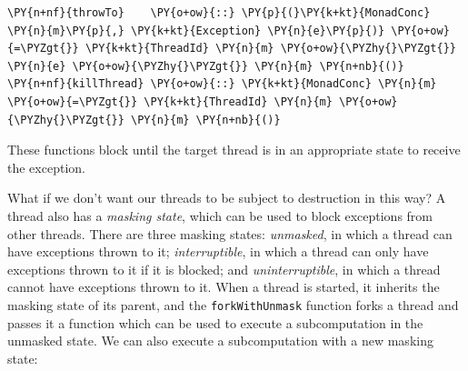 
\begin{Verbatim}[commandchars=\\\{\}]
\PY{n+nf}{throwTo}    \PY{o+ow}{::} \PY{p}{(}\PY{k+kt}{MonadConc} \PY{n}{m}\PY{p}{,} \PY{k+kt}{Exception} \PY{n}{e}\PY{p}{)} \PY{o+ow}{=\PYZgt{}} \PY{k+kt}{ThreadId} \PY{n}{m} \PY{o+ow}{\PYZhy{}\PYZgt{}} \PY{n}{e} \PY{o+ow}{\PYZhy{}\PYZgt{}} \PY{n}{m} \PY{n+nb}{()}
\PY{n+nf}{killThread} \PY{o+ow}{::} \PY{k+kt}{MonadConc} \PY{n}{m} \PY{o+ow}{=\PYZgt{}} \PY{k+kt}{ThreadId} \PY{n}{m} \PY{o+ow}{\PYZhy{}\PYZgt{}} \PY{n}{m} \PY{n+nb}{()}
\end{Verbatim}

These functions block until the target thread is in an appropriate
state to receive the exception.

What if we don't want our threads to be subject to destruction in this
way? A thread also has a \textit{masking state}, which can be used to
block exceptions from other threads. There are three masking states:
\textit{unmasked}, in which a thread can have exceptions thrown to it;
\textit{interruptible}, in which a thread can only have exceptions
thrown to it if it is blocked; and \textit{uninterruptible}, in which
a thread cannot have exceptions thrown to it. When a thread is
started, it inherits the masking state of its parent, and the
\texttt{forkWithUnmask} function forks a thread and passes it a
function which can be used to execute a subcomputation in the unmasked
state. We can also execute a subcomputation with a new masking state:


